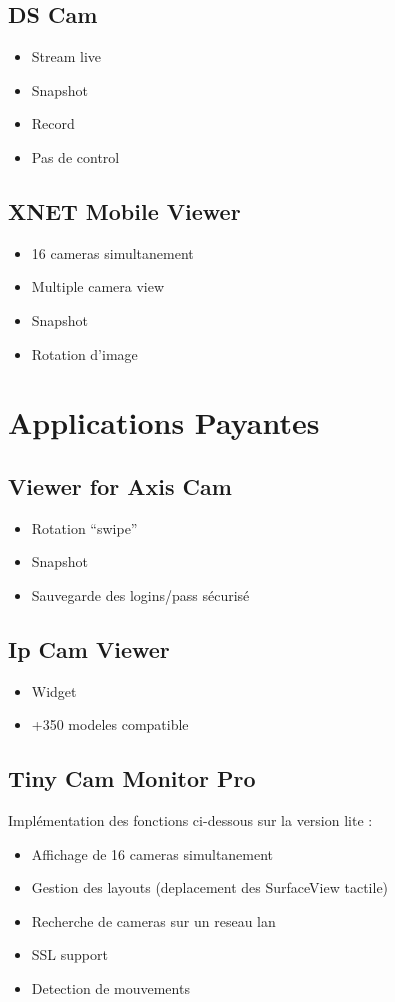 \documentclass[a4paper,10pt]{report}
\begin{document}
\subsection{DS Cam}
\begin{itemize}
  \item Stream live
  \item Snapshot
  \item Record
  \item Pas de control
\end{itemize}

\subsection{XNET Mobile Viewer}
\begin{itemize}
  \item 16 cameras simultanement
  \item Multiple camera view
  \item Snapshot
  \item Rotation d'image
\end{itemize}

\section{Applications Payantes}
\subsection{Viewer for Axis Cam}
\begin{itemize}
  \item Rotation ``swipe''
  \item Snapshot
  \item Sauvegarde des logins/pass sécurisé
\end{itemize}

\subsection{Ip Cam Viewer}
\begin{itemize}
  \item Widget
  \item +350 modeles compatible
\end{itemize}

\subsection{Tiny Cam Monitor Pro}
Implémentation des fonctions ci-dessous sur la version lite :
\begin{itemize}
  \item Affichage de 16 cameras simultanement
  \item Gestion des layouts (deplacement des SurfaceView tactile)
  \item Recherche de cameras sur un reseau lan
  \item SSL support
  \item Detection de mouvements
\end{itemize}
\end{document}
